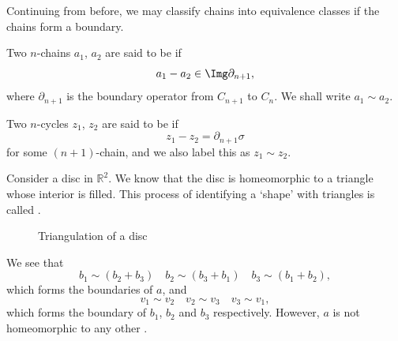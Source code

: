 \documentclass[notoc,notitlepage]{tufte-book}
\begin{document}
Continuing from before, we may classify chains into equivalence classes if the
chains form a boundary.

\begin{defn}[Homologous]\label{defn:homologous}
  Two $n$-chains $a_1$, $a_2$ are said to be  if
  \begin{equation*}
    a_1 - a_2 \in \Img \partial_{n + 1},
  \end{equation*}
  where $\partial_{n + 1}$ is the boundary operator from $C_{n + 1}$ to $C_n$.
  We shall write $a_1 \sim a_2$.

  Two $n$-cycles $z_1$, $z_2$ are said to be  if
  \begin{equation*}
    z_1 - z_2 = \partial_{n + 1} \sigma
  \end{equation*}
  for some $(n + 1)$-chain, and we also label this as $z_1 \sim z_2$.
\end{defn}

\begin{eg}\label{eg:first_eg_of_triangulation}
  Consider a disc in $\mathbb{R}^2$. We know that the disc is homeomorphic to a
  triangle whose interior is filled. This process of identifying a `shape' with
  triangles is called .
  \begin{figure}[ht]
    \centering
    \caption{Triangulation of a disc}
    \label{fig:triangulation_of_a_disc}
  \end{figure}
  We see that
  \begin{equation*}
    b_1 \sim (b_2 + b_3) \quad b_2 \sim (b_3 + b_1) \quad b_3 \sim (b_1 + b_2),
  \end{equation*}
  which forms the boundaries of $a$, and
  \begin{equation*}
    v_1 \sim v_2 \quad v_2 \sim v_3 \quad v_3 \sim v_1,
  \end{equation*}
  which forms the boundary of $b_1$, $b_2$ and $b_3$ respectively.  However, $a$
  is not homeomorphic to any other .
\end{eg}
\end{document}
